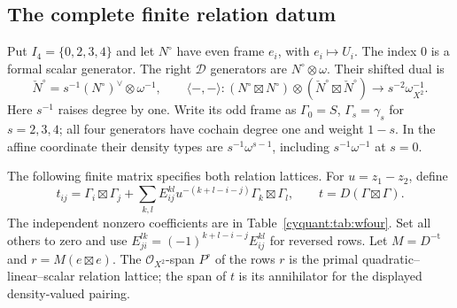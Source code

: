 \subsection{The complete finite relation datum}

Put $I_4=\{0,2,3,4\}$ and let $N^\circ$ have even frame $e_i$,
with $e_i\mapsto U_i$.  The index $0$ is a formal scalar generator.
The right $\mathcal D$ generators are $N^\circ\otimes\omega$.
Their shifted dual is
\[
 \check N^\circ=s^{-1}(N^\circ)^\vee\otimes\omega^{-1},
 \qquad
 \langle-,-\rangle:(N^\circ\boxtimes N^\circ)
       \otimes(\check N^\circ\boxtimes\check N^\circ)
       \longrightarrow s^{-2}\omega^{-1}_{X^2}.
\]
Here $s^{-1}$ raises degree by one.  Write its odd frame as
$\Gamma_0=S$, $\Gamma_s=\gamma_s$ for $s=2,3,4$;
all four generators have cochain degree one and weight $1-s$.
In the affine coordinate their density types are
$s^{-1}\omega^{s-1}$, including $s^{-1}\omega^{-1}$ at $s=0$.

The following finite matrix specifies both relation lattices.
For $u=z_1-z_2$, define
\begin{equation}\label{cyquant:eq:wfour-dual-frame}
 t_{ij}=\Gamma_i\boxtimes\Gamma_j+
       \sum_{k,l}E_{ij}^{kl}u^{-(k+l-i-j)}
                            \Gamma_k\boxtimes\Gamma_l,
 \qquad t=D(\Gamma\boxtimes\Gamma).
\end{equation}
The independent nonzero coefficients are in
Table~\ref{cyquant:tab:wfour}.  Set all others to zero and use
$E_{ji}^{lk}=(-1)^{k+l-i-j}E_{ij}^{kl}$ for reversed rows.
Let $M=D^{-\mathrm t}$ and $r=M(e\boxtimes e)$.
The $\mathcal O_{X^2}$-span $P^\circ$ of the rows $r$ is the primal
quadratic--linear--scalar relation lattice; the span of $t$ is its
annihilator for the displayed density-valued pairing.


